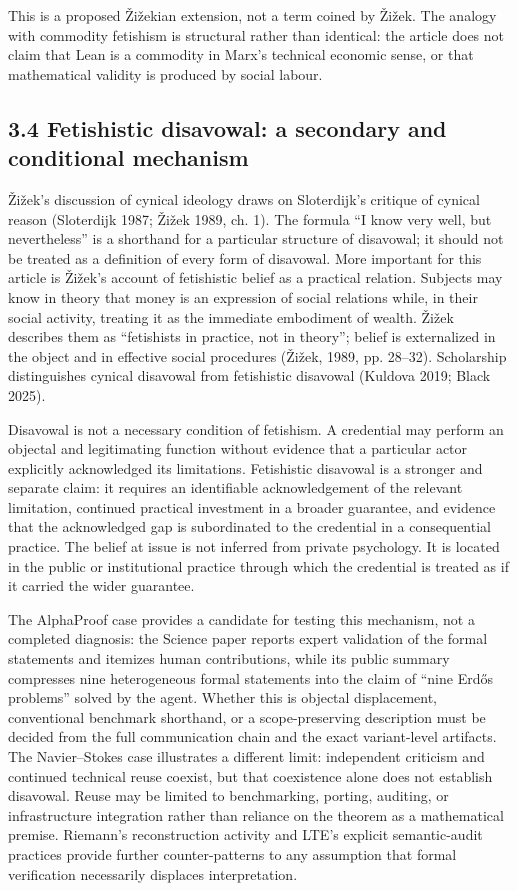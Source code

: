 \documentclass[sn-apa]{sn-jnl}
\begin{document}
This is a proposed Žižekian extension, not a term coined by Žižek. The analogy with commodity fetishism is structural rather than identical: the article does not claim that Lean is a commodity in Marx’s technical economic sense, or that mathematical validity is produced by social labour.

\subsection{3.4 Fetishistic disavowal: a secondary and conditional mechanism}

Žižek’s discussion of cynical ideology draws on Sloterdijk’s critique of cynical reason (Sloterdijk 1987; Žižek 1989, ch. 1). The formula “I know very well, but nevertheless” is a shorthand for a particular structure of disavowal; it should not be treated as a definition of every form of disavowal. More important for this article is Žižek’s account of fetishistic belief as a practical relation. Subjects may know in theory that money is an expression of social relations while, in their social activity, treating it as the immediate embodiment of wealth. Žižek describes them as “fetishists in practice, not in theory”; belief is externalized in the object and in effective social procedures (Žižek, 1989, pp. 28–32). Scholarship distinguishes cynical disavowal from fetishistic disavowal (Kuldova 2019; Black 2025).

Disavowal is not a necessary condition of fetishism. A credential may perform an objectal and legitimating function without evidence that a particular actor explicitly acknowledged its limitations. Fetishistic disavowal is a stronger and separate claim: it requires an identifiable acknowledgement of the relevant limitation, continued practical investment in a broader guarantee, and evidence that the acknowledged gap is subordinated to the credential in a consequential practice. The belief at issue is not inferred from private psychology. It is located in the public or institutional practice through which the credential is treated as if it carried the wider guarantee.

The AlphaProof case provides a candidate for testing this mechanism, not a completed diagnosis: the Science paper reports expert validation of the formal statements and itemizes human contributions, while its public summary compresses nine heterogeneous formal statements into the claim of “nine Erdős problems” solved by the agent. Whether this is objectal displacement, conventional benchmark shorthand, or a scope-preserving description must be decided from the full communication chain and the exact variant-level artifacts. The Navier–Stokes case illustrates a different limit: independent criticism and continued technical reuse coexist, but that coexistence alone does not establish disavowal. Reuse may be limited to benchmarking, porting, auditing, or infrastructure integration rather than reliance on the theorem as a mathematical premise. Riemann’s reconstruction activity and LTE’s explicit semantic-audit practices provide further counter-patterns to any assumption that formal verification necessarily displaces interpretation.
\end{document}
